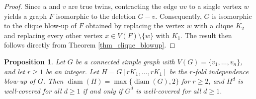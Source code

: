 \documentclass[12pt]{amsart}
\numberwithin{equation}{section}
\newtheorem{prop}[thm]{\bf Proposition}
\theoremstyle{definition}
\begin{document}
\begin{proof}
Since $u$ and $v$ are true twins, contracting the edge $uv$ to a single vertex $w$ yields a graph $F$ isomorphic to the deletion $G - v$. Consequently, $G$ is isomorphic to the clique blow-up of $F$ obtained by replacing the vertex $w$ with a clique $K_2$ and replacing every other vertex $x \in V(F) \setminus \{w\}$ with $K_1$. The result then follows directly from Theorem \ref{thm_clique_blowup}.
\end{proof}

\begin{prop}\label{prop_ind_blow}
Let $G$ be a connected simple graph with $V(G) = \{v_1, \ldots, v_n\}$, and let $r \ge 1$ be an integer. Let $H = G[r K_1, \ldots, r K_1]$ be the $r$-fold independence blow-up of $G$. 
Then $\operatorname{diam}(H) = \max\{\operatorname{diam}(G), 2\}$ for $r \ge 2$, and $H^d$ is well-covered for all $d \ge 1$ if and only if $G^d$ is well-covered for all $d \ge 1$.
\end{prop}
\end{document}
